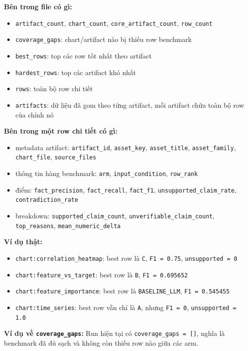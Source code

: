 \documentclass[11pt,a4paper]{article}
\newcommand{\field}[1]{\texttt{#1}}
\begin{document}
\textbf{Bên trong file có gì:}
\begin{itemize}
  \item \field{artifact\_count}, \field{chart\_count}, \field{core\_artifact\_count}, \field{row\_count}
  \item \field{coverage\_gaps}: chart/artifact nào bị thiếu row benchmark
  \item \field{best\_rows}: top các row tốt nhất theo artifact
  \item \field{hardest\_rows}: top các artifact khó nhất
  \item \field{rows}: toàn bộ row chi tiết
  \item \field{artifacts}: dữ liệu đã gom theo từng artifact, mỗi artifact chứa toàn bộ row của chính nó
\end{itemize}

\textbf{Bên trong một row chi tiết có gì:}
\begin{itemize}
  \item metadata artifact:
  \field{artifact\_id}, \field{asset\_key}, \field{asset\_title},
  \field{asset\_family}, \field{chart\_file}, \field{source\_files}
  \item thông tin hàng benchmark:
  \field{arm}, \field{input\_condition}, \field{row\_rank}
  \item điểm:
  \field{fact\_precision}, \field{fact\_recall}, \field{fact\_f1},
  \field{unsupported\_claim\_rate}, \field{contradiction\_rate}
  \item breakdown:
  \field{supported\_claim\_count},
  \field{unverifiable\_claim\_count},
  \field{top\_reasons},
  \field{mean\_numeric\_delta}
\end{itemize}

\textbf{Ví dụ thật:}
\begin{itemize}
  \item \field{chart:correlation\_heatmap}: best row là \field{C}, \field{F1 = 0.75}, \field{unsupported = 0}
  \item \field{chart:feature\_vs\_target}: best row là \field{B}, \field{F1 = 0.695652}
  \item \field{chart:feature\_importance}: best row là \field{BASELINE\_LLM}, \field{F1 = 0.545455}
  \item \field{chart:time\_series}: best row vẫn chỉ là \field{A}, nhưng \field{F1 = 0}, \field{unsupported = 1.0}
\end{itemize}

\textbf{Ví dụ về \field{coverage\_gaps}:}
Run hiện tại có
\field{coverage\_gaps = []},
nghĩa là benchmark đã đủ sạch và không còn thiếu row nào giữa các arm.
\end{document}
